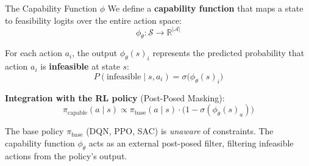 \documentclass[11pt,aspectratio=169]{beamer}
\begin{document}
\begin{frame}{The Capability Function $\phi$}
    We define a \textbf{capability function} that maps a state to feasibility logits over the entire action space:
    \begin{equation}
        \phi_\theta: \mathcal{S} \rightarrow \mathbb{R}^{|\mathcal{A}|}
    \end{equation}

    For each action $a_i$, the output $\phi_\theta(s)_i$ represents the predicted probability that action $a_i$ is \textbf{infeasible} at state $s$:
    \begin{equation}
        P(\text{infeasible} \mid s, a_i) = \sigma\big(\phi_\theta(s)_i\big)
    \end{equation}

    \textbf{Integration with the RL policy} (Post-Posed Masking):
    \begin{equation}
        \pi_{\text{capable}}(a \mid s) \propto \pi_{\text{base}}(a \mid s) \cdot \big(1 - \sigma(\phi_\theta(s)_a)\big)
    \end{equation}

    The base policy $\pi_{\text{base}}$ (DQN, PPO, SAC) is \textit{unaware} of constraints. The capability function $\phi_\theta$ acts as an external post-posed filter, filtering infeasible actions from the policy's output.
\end{frame}
\end{document}
